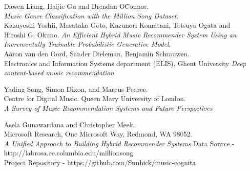 \documentclass{sig-alternate-05-2015}
\begin{document}
\begin{thebibliography}{}
Dawen Liang, Haijie Gu and Brendan O\`Connor.\\
\textit{Music Genre Classification with the Million Song Dataset}. \\
 
Kazuyoshi Yoshii, Masataka Goto, Kazunori Komatani, Tetsuya Ogata and Hiroshi G. Okuno.
\textit{An Efficient Hybrid Music Recommender System Using an Incrementally Trainable Probabilistic Generative Model}. \\

A$\bar{a}$ron van den Oord, Sander Dieleman, Benjamin Schrauwen. \\
Electronics and Information Systems department (ELIS), Ghent University
\textit{Deep content-based music recommendation}

Yading Song, Simon Dixon, and Marcus Pearce.\\
Centre for Digital Music. Queen Mary University of London.\\
\textit{A Survey of Music Recommendation Systems and Future Perspectives}

Asela Gunawardana and Christopher Meek.\\
Microsoft Research, One Microsoft Way, Redmond, WA 98052.\\
\textit{A Unified Approach to Building Hybrid Recommender Systems}
Data Source - http://labrosa.ee.columbia.edu/millionsong\\

Project Repository - https://github.com/Sunhick/music-cognita\\
\end{thebibliography}



\end{document}
